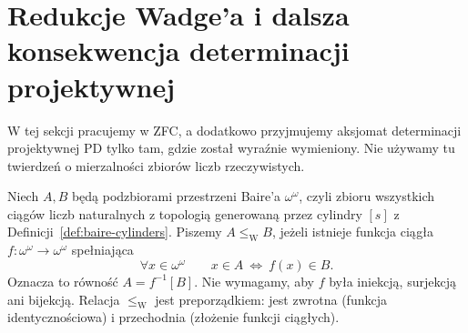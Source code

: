 \section{Redukcje Wadge'a i dalsza konsekwencja determinacji projektywnej}
\label{sec:pd-wadge-reductions}
W tej sekcji pracujemy w ZFC, a dodatkowo przyjmujemy
aksjomat determinacji projektywnej PD tylko tam, gdzie
został wyraźnie wymieniony. Nie używamy tu twierdzeń
o mierzalności zbiorów liczb rzeczywistych.

\begin{definicja}
\label{def:wadge-reducibility}
Niech $A,B$ będą podzbiorami przestrzeni Baire'a
$\omega^\omega$, czyli zbioru wszystkich ciągów liczb
naturalnych z topologią generowaną przez cylindry
$[s]$ z Definicji~\ref{def:baire-cylinders}.
Piszemy $A\leq_{\mathrm W}B$, jeżeli istnieje
funkcja ciągła $f:\omega^\omega\to\omega^\omega$
spełniająca
\[
\forall x\in\omega^\omega\qquad
   x\in A\ \Longleftrightarrow\ f(x)\in B.
\]
Oznacza to równość $A=f^{-1}[B]$.
Nie wymagamy, aby $f$ była iniekcją, surjekcją
ani bijekcją. Relacja $\leq_{\mathrm W}$ jest
preporządkiem: jest zwrotna (funkcja identycznościowa)
i przechodnia (złożenie funkcji ciągłych).
\end{definicja}

